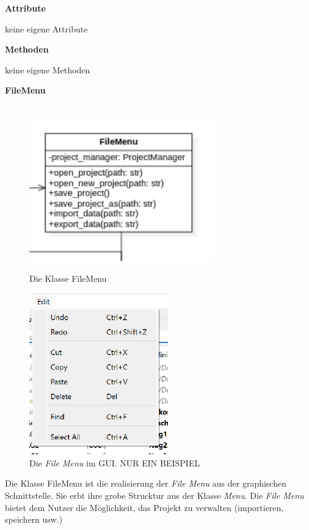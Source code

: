 \documentclass{article}
\begin{document}
\textbf{{Attribute}}
\begin{itemize}
    keine eigene Attribute \newline
\end{itemize}
    
\textbf{{Methoden}}
\begin{itemize}
    keine eigene Methoden
\end{itemize}

\newpage
\textbf{\large{FileMenu}}\\\\
\begin{figure}[H]%
    
    \centering
    \begin{minipage}[b]{0.4\textwidth}
        \includegraphics[width=8cm]{entwurf/Entwurf_dokument/img/Alissa/FileMenu.png}
        \caption{Die Klasse FileMenu}
    \end{minipage}
    \hfill
    \begin{minipage}[b]{0.4\textwidth}
        \includegraphics[width=6cm]{entwurf/Entwurf_dokument/img/Alissa/FileMenuGUI.png}
    \caption{Die \textit{File Menu} im GUI. NUR EIN BEISPIEL}
    \end{minipage}
\end{figure}
Die Klasse FileMenu ist die realisierung der \textit{File Menu} aus der graphischen Schnittstelle. Sie erbt ihre grobe Strucktur aus der Klasse \textit{Menu}. Die \textit{File Menu} bietet dem Nutzer die Möglichkeit, das Projekt zu verwalten (importieren, speichern usw.)
\newline \newline
\end{document}

